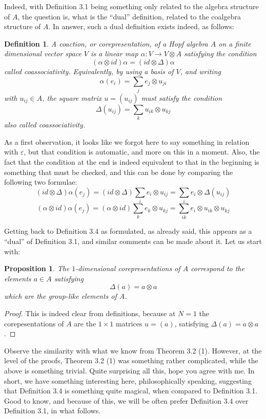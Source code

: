 \documentclass[12pt]{amsbook}
\newtheorem{definition}[theorem]{Definition}
\newtheorem{proposition}[theorem]{Proposition}
\begin{document}
\bigskip

Indeed, with Definition 3.1 being something only related to the algebra structure of $A$, the question is, what is the ``dual'' definition, related to the coalgebra structure of $A$. In answer, such a dual definition exists indeed, as follows:


\begin{definition}
A coaction, or corepresentation, of a Hopf algebra $A$ on a finite dimensional vector space $V$ is a linear map $\alpha:V\to V\otimes A$ satisfying the condition
$$(\alpha\otimes id)\alpha=(id\otimes\Delta)\alpha$$
called coassociativity. Equivalently, by using a basis of $V$, and writing
$$\alpha(e_i)=\sum_je_j\otimes u_{ji}$$ 
with $u_{ij}\in A$, the square matrix $u=(u_{ij})$ must satisfy the condition
$$\Delta(u_{ij})=\sum_ku_{ik}\otimes u_{kj}$$
also called coassociativity.
\end{definition}

As a first observation, it looks like we forgot here to say something in relation with $\varepsilon$, but that condition is automatic, and more on this in a moment. Also, the fact that the condition at the end is indeed equivalent to that in the beginning is something that must be checked, and this can be done by comparing the following two formulae:
$$(id\otimes\Delta)\alpha(e_j)
=(id\otimes\Delta)\sum_ie_i\otimes u_{ij}
=\sum_ie_i\otimes\Delta(u_{ij})$$
$$(\alpha\otimes id)\alpha(e_j)
=(\alpha\otimes id)\sum_ke_k\otimes u_{kj}
=\sum_{ik}e_i\otimes u_{ik}\otimes u_{kj}$$

Getting back to Definition 3.4 as formulated, as already said, this appears as a ``dual'' of Definition 3.1, and similar comments can be made about it. Let us start with:

\begin{proposition}
The $1$-dimensional corepresentations of $A$ correspond to the elements $a\in A$ satisfying 
$$\Delta(a)=a\otimes a$$
which are the group-like elements of $A$.
\end{proposition}

\begin{proof}
This is indeed clear from definitions, because at $N=1$ the corepesentations of $A$ are the $1\times1$ matrices $u=(a)$, satisfying $\Delta(a)=a\otimes a$.
\end{proof}

Observe the similarity with what we know from Theorem 3.2 (1). However, at the level of the proofs, Theorem 3.2 (1) was something rather complicated, while the above is something trivial. Quite surprising all this, hope you agree with me. In short, we have something interesting here, philosophically speaking, suggesting that Definition 3.4 is something quite magical, when compared to Definition 3.1. Good to know, and because of this, we will be often prefer Definition 3.4 over Definition 3.1, in what follows.
\end{document}
